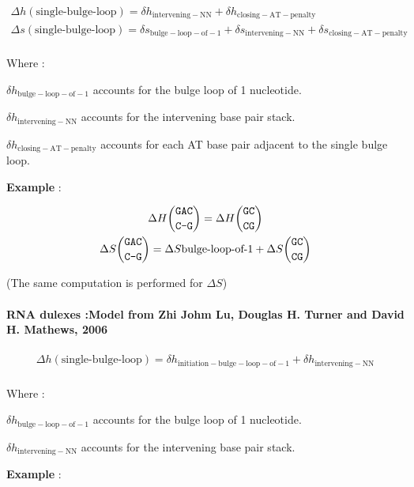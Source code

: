 \documentclass{article}
\begin{document}
\begin{multline*}
\Delta h {(\mbox{single-bulge-loop})} =
\delta{}h_\mathrm{intervening-NN} +
\delta{}h_\mathrm{closing-AT-penalty}\\
\Delta s {(\mbox{single-bulge-loop})} =
\delta{}s_\mathrm{bulge-loop-of-1} +
\delta{}s_\mathrm{intervening-NN} +
\delta{}s_\mathrm{closing-AT-penalty}\\
\end{multline*}


Where :

$\delta{}h_\mathrm{bulge-loop-of-1}$ accounts for the bulge loop of 1 nucleotide.

$\delta{}h_\mathrm{intervening-NN}$ accounts for the intervening base pair stack.

$\delta{}h_\mathrm{closing-AT-penalty}$ accounts for each AT base pair adjacent
to the single bulge loop.

\textbf{Example} :

\begin{multline*}
\Delta H {\mbox{\texttt{GAC}} \choose \mbox{\texttt{C-G}}} =
\Delta H {\mbox{\texttt{GC}} \choose \mbox{\texttt{CG}}} \\
\Delta S {\mbox{\texttt{GAC}} \choose \mbox{\texttt{C-G}}} =
\Delta S {\mbox{bulge-loop-of-1}} +
\Delta S {\mbox{\texttt{GC}} \choose \mbox{\texttt{CG}}} \\
\end{multline*}

       (The same computation is performed for $\Delta S$) 

\paragraph{RNA dulexes :\textbf{Model from Zhi Johm Lu, Douglas H. Turner and David H. Mathews, 2006}} 

\begin{multline*}
\Delta h {(\mbox{single-bulge-loop})} =
\delta{}h_\mathrm{initiation-bulge-loop-of-1} +
\delta{}h_\mathrm{intervening-NN} \\
\end{multline*}


Where :

$\delta{}h_\mathrm{bulge-loop-of-1}$ accounts for the bulge loop of 1 nucleotide.

$\delta{}h_\mathrm{intervening-NN}$ accounts for the intervening base pair stack.


\textbf{Example} :
\end{document}
